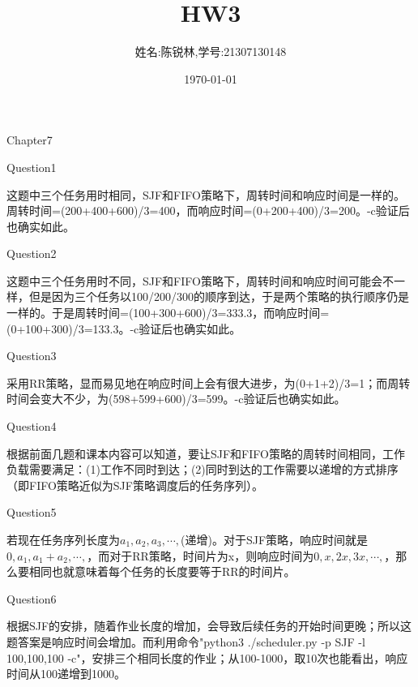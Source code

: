 \documentclass[12pt]{article}
\title{HW3}
\author{姓名:陈锐林,学号:21307130148}
\date{\today}
\begin{document}
\maketitle
\begin{LARGE}
    \noindent Chapter7\\
\end{LARGE}
\begin{large}
	\noindent Question1\\
\end{large}
\hspace*{2em}这题中三个任务用时相同，SJF和FIFO策略下，周转时间和响应时间是一样的。周转时间=(200+400+600)/3=400，而响应时间=(0+200+400)/3=200。-c验证后也确实如此。\\

\begin{large}
	\noindent Question2\\
\end{large}
\hspace*{2em}这题中三个任务用时不同，SJF和FIFO策略下，周转时间和响应时间可能会不一样，但是因为三个任务以100/200/300的顺序到达，于是两个策略的执行顺序仍是一样的。于是周转时间=(100+300+600)/3=333.3，而响应时间=(0+100+300)/3=133.3。-c验证后也确实如此。\\

\begin{large}
	\noindent Question3\\
\end{large}
\hspace*{2em}采用RR策略，显而易见地在响应时间上会有很大进步，为(0+1+2)/3=1；而周转时间会变大不少，为(598+599+600)/3=599。-c验证后也确实如此。\\

\begin{large}
	\noindent Question4\\
\end{large}
\hspace*{2em}根据前面几题和课本内容可以知道，要让SJF和FIFO策略的周转时间相同，工作负载需要满足：(1)工作不同时到达；(2)同时到达的工作需要以递增的方式排序（即FIFO策略近似为SJF策略调度后的任务序列）。\\

\begin{large}
	\noindent Question5\\
\end{large}
\hspace*{2em}若现在任务序列长度为{$a_1,a_2,a_3,\cdots,$}(递增)。对于SJF策略，响应时间就是{$0,a_1,a_1+a_2,\cdots,$}，而对于RR策略，时间片为x，则响应时间为{$0,x,2x,3x,\cdots,$}，那么要相同也就意味着每个任务的长度要等于RR的时间片。
\newpage
\begin{large}
	\noindent Question6\\
\end{large}
\hspace*{2em}根据SJF的安排，随着作业长度的增加，会导致后续任务的开始时间更晚；所以这题答案是响应时间会增加。而利用命令"python3 ./scheduler.py -p SJF -l 100,100,100 -c"，安排三个相同长度的作业；从100-1000，取10次也能看出，响应时间从100递增到1000。\\
\end{document}
